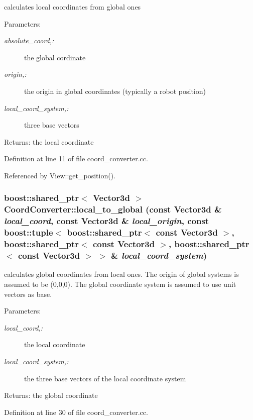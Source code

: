 calculates local coordinates from global ones \begin{Desc}
\item[Parameters:]
\begin{description}
\item[{\em absolute\_\-coord,:}]the global cordinate \item[{\em origin,:}]the origin in global coordinates (typically a robot position) \item[{\em local\_\-coord\_\-system,:}]three base vectors \end{description}
\end{Desc}
\begin{Desc}
\item[Returns:]the local coordinate \end{Desc}


Definition at line 11 of file coord\_\-converter.cc.

Referenced by View::get\_\-position().\hypertarget{namespace_coord_converter_4b23c9940a307b7cc9e3e9d843a48770}{
\subsubsection[local\_\-to\_\-global]{\setlength{\rightskip}{0pt plus 5cm}boost::shared\_\-ptr$<$ Vector3d $>$ CoordConverter::local\_\-to\_\-global (const Vector3d \& {\em local\_\-coord}, \/  const Vector3d \& {\em local\_\-origin}, \/  const boost::tuple$<$ boost::shared\_\-ptr$<$ const Vector3d $>$, boost::shared\_\-ptr$<$ const Vector3d $>$, boost::shared\_\-ptr$<$ const Vector3d $>$ $>$ \& {\em local\_\-coord\_\-system})}}
\label{namespace_coord_converter_4b23c9940a307b7cc9e3e9d843a48770}


calculates global coordinates from local ones. The origin of global systems is assumed to be (0,0,0). The global coordinate system is assumed to use unit vectors as base. \begin{Desc}
\item[Parameters:]
\begin{description}
\item[{\em local\_\-coord,:}]the local coordinate \item[{\em local\_\-coord\_\-system,:}]the three base vectors of the local coordinate system \end{description}
\end{Desc}
\begin{Desc}
\item[Returns:]the global coordinate \end{Desc}


Definition at line 30 of file coord\_\-converter.cc.